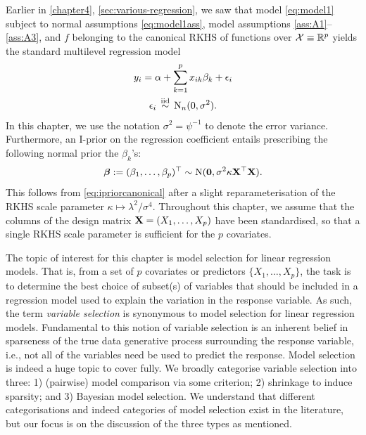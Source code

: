 \documentclass[a4paper,showframe,11pt]{report}
\begin{document}
\label{chapter6}

Earlier in \cref{chapter4}, \cref{sec:various-regression}, we saw that model \cref{eq:model1} subject to normal assumptions \cref{eq:model1ass}, model assumptions \ref{ass:A1}--\ref{ass:A3}, and $f$ belonging to the canonical RKHS of functions over ${\mathcal X} \equiv \mathbb{R}^p$ yields the standard multilevel regression model
\begin{align}\label{eq:linmod}
  \begin{gathered}
    y_i = \alpha + \sum_{k=1}^p x_{ik}\beta_k + \epsilon_i \\
    \epsilon_i \,\overset{\text{iid}}{\sim}\, \operatorname{N}_n(0, \sigma^2).
  \end{gathered}  
\end{align}
In this chapter, we use the notation $\sigma^2 = \psi^{-1}$ to denote the error variance.
Furthermore, an I-prior on the regression coefficient entails prescribing the following normal prior the $\beta_k$'s:
\[
  {\bm\beta} := (\beta_1,\dots,\beta_p)^\top \sim \operatorname{N} ({\mathbf 0}, \sigma^2 \kappa \mathbf X^\top \mathbf X).
\]
This follows from \cref{eq:ipriorcanonical} after a slight reparameterisation of the RKHS scale parameter $\kappa \mapsto \lambda^2/\sigma^4$. 
Throughout this chapter, we assume that the columns of the design matrix ${\mathbf X} = (X_1,\dots,X_p)$ have been standardised, so that a single RKHS scale parameter is sufficient for the $p$ covariates.

The topic of interest for this chapter is model selection for linear regression models.
That is, from a set of $p$ covariates or predictors $\{X_1,\dots,X_p\}$, the task is to determine the best choice of subset(s) of variables that should be included in a regression model used to explain the variation in the response variable.
As such, the term \emph{variable selection} is synonymous to model selection for linear regression models.
Fundamental to this notion of variable selection is an inherent belief in sparseness of the true data generative process surrounding the response variable, i.e., not all of the variables need be used to predict the response.
Model selection is indeed a huge topic to cover fully.
We broadly categorise variable selection into three: 1) (pairwise) model comparison via some criterion; 2) shrinkage to induce sparsity; and 3) Bayesian model selection.
We understand that different categorisations and indeed categories of model selection exist in the literature, but our focus is on the discussion of the three types as mentioned.
\end{document}

